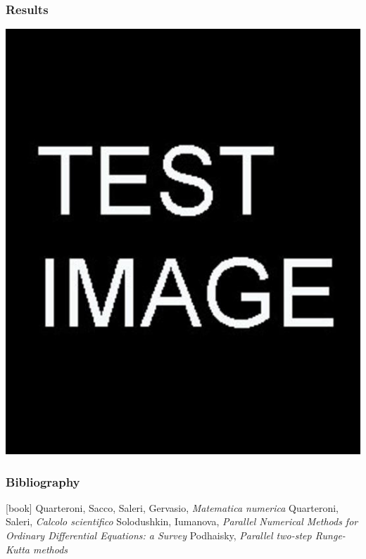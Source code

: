 \documentclass{beamer}
\begin{document}
\begin{frame} %
	\frametitle{Results}
	\includegraphics[scale=0.3]{etc/test.jpg}
\end{frame}


\begin{frame} %
	\frametitle{Bibliography}
	\begin{thebibliography}{9}
		 Quarteroni, Sacco, Saleri, Gervasio, \textit{Matematica numerica}
		 Quarteroni, Saleri, \textit{Calcolo scientifico}
		 Solodushkin, Iumanova, \textit{Parallel Numerical Methods for Ordinary Differential Equations: a Survey}
		 Podhaisky, \textit{Parallel two-step Runge-Kutta methods}
	\end{thebibliography}
\end{frame}
\end{document}
